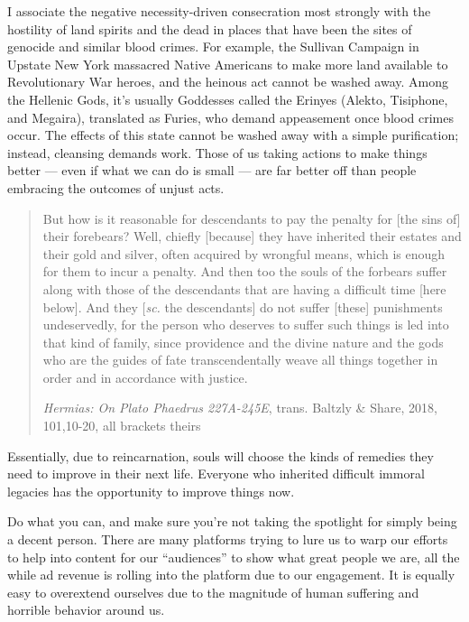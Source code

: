 \documentclass[
]{book}
\begin{document}
I associate the negative necessity-driven consecration most strongly with the hostility of land spirits and the dead in places that have been the sites of genocide and similar blood crimes. For example, the Sullivan Campaign in Upstate New York massacred Native Americans to make more land available to Revolutionary War heroes, and the heinous act cannot be washed away. Among the Hellenic Gods, it's usually Goddesses called the Erinyes (Alekto, Tisiphone, and Megaira), translated as Furies, who demand appeasement once blood crimes occur. The effects of this state cannot be washed away with a simple purification; instead, cleansing demands work. Those of us taking actions to make things better --- even if what we can do is small --- are far better off than people embracing the outcomes of unjust acts.

\begin{quote}
But how is it reasonable for descendants to pay the penalty for {[}the sins of{]} their forebears? Well, chiefly {[}because{]} they have inherited their estates and their gold and silver, often acquired by wrongful means, which is enough for them to incur a penalty. And then too the souls of the forbears suffer along with those of the descendants that are having a difficult time {[}here below{]}. And they {[}\emph{sc.} the descendants{]} do not suffer {[}these{]} punishments undeservedly, for the person who deserves to suffer such things is led into that kind of family, since providence and the divine nature and the gods who are the guides of fate transcendentally weave all things together in order and in accordance with justice.

\emph{Hermias: On Plato Phaedrus 227A-245E}, trans. Baltzly \& Share, 2018, 101,10-20, all brackets theirs
\end{quote}

Essentially, due to reincarnation, souls will choose the kinds of remedies they need to improve in their next life. Everyone who inherited difficult immoral legacies has the opportunity to improve things now.

Do what you can, and make sure you're not taking the spotlight for simply being a decent person. There are many platforms trying to lure us to warp our efforts to help into content for our ``audiences'' to show what great people we are, all the while ad revenue is rolling into the platform due to our engagement. It is equally easy to overextend ourselves due to the magnitude of human suffering and horrible behavior around us.
\end{document}
